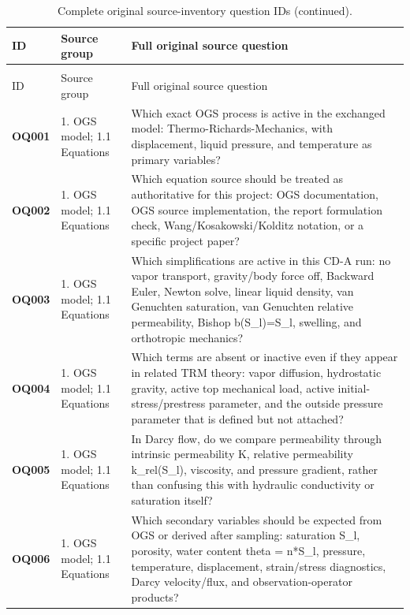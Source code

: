 \begin{longtable}{@{}L{0.10\textwidth} L{0.23\textwidth} L{0.59\textwidth}@{}}
\caption{Complete original source-inventory question IDs.}\label{tab:original-source-question-register}\\
\toprule
ID & Source group & Full original source question\\
\midrule
\endfirsthead
\caption[]{Complete original source-inventory question IDs (continued).}\\
\toprule
ID & Source group & Full original source question\\
\midrule
\endhead
\bottomrule
\endlastfoot
\textbf{OQ001} & 1. OGS model; 1.1 Equations & Which exact OGS process is active in the exchanged model: Thermo-Richards-Mechanics, with displacement, liquid pressure, and temperature as primary variables?\\
\addlinespace[0.16em]
\textbf{OQ002} & 1. OGS model; 1.1 Equations & Which equation source should be treated as authoritative for this project: OGS documentation, OGS source implementation, the report formulation check, Wang/Kosakowski/Kolditz notation, or a specific project paper?\\
\addlinespace[0.16em]
\textbf{OQ003} & 1. OGS model; 1.1 Equations & Which simplifications are active in this CD-A run: no vapor transport, gravity/body force off, Backward Euler, Newton solve, linear liquid density, van Genuchten saturation, van Genuchten relative permeability, Bishop b(S\_l)=S\_l, swelling, and orthotropic mechanics?\\
\addlinespace[0.16em]
\textbf{OQ004} & 1. OGS model; 1.1 Equations & Which terms are absent or inactive even if they appear in related TRM theory: vapor diffusion, hydrostatic gravity, active top mechanical load, active initial-stress/prestress parameter, and the outside pressure parameter that is defined but not attached?\\
\addlinespace[0.16em]
\textbf{OQ005} & 1. OGS model; 1.1 Equations & In Darcy flow, do we compare permeability through intrinsic permeability K, relative permeability k\_rel(S\_l), viscosity, and pressure gradient, rather than confusing this with hydraulic conductivity or saturation itself?\\
\addlinespace[0.16em]
\textbf{OQ006} & 1. OGS model; 1.1 Equations & Which secondary variables should be expected from OGS or derived after sampling: saturation S\_l, porosity, water content theta = n*S\_l, pressure, temperature, displacement, strain/stress diagnostics, Darcy velocity/flux, and observation-operator products?\\

\end{longtable}
